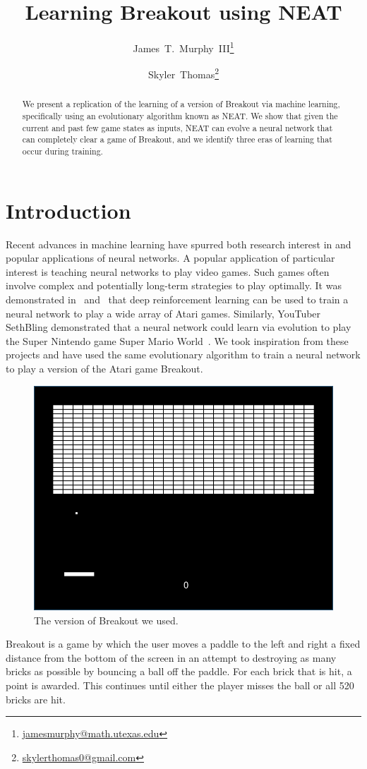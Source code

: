 \documentclass[letterpaper, twocolumn, conference]{article}
\author{James~T.~Murphy~III\thanks{\url{jamesmurphy@math.utexas.edu}}\and{}Skyler~Thomas\thanks{\url{skylerthomas0@gmail.com}}}
\title{Learning Breakout using NEAT}
\begin{document}
\maketitle{}
\begin{abstract}
    We present a replication of the learning of a version of
    Breakout via machine learning, specifically using an evolutionary algorithm known as NEAT.
    We show that given the current and past few game states as inputs, NEAT
    can evolve a neural network that can completely clear a game of Breakout,
    and we identify three eras of learning that occur during training.
\end{abstract}

\section{Introduction}

Recent advances in machine learning have spurred both research interest in and popular applications
of neural networks.
A popular application of particular interest is teaching neural networks to play video games.
Such games often involve complex and potentially long-term strategies to play optimally.
It was demonstrated in~\cite{mnih2013playing} and~\cite{mnih2015human} that deep reinforcement learning can be used to train a neural network
to play a wide array of Atari games.
Similarly, YouTuber SethBling demonstrated that a neural network could learn via evolution to play the Super Nintendo game Super Mario World~\cite{sethbling2015}.
We took inspiration from these projects and have used the same evolutionary algorithm to train a neural network
to play a version of the Atari game Breakout.

\begin{figure}[h!]
    \centering
    \includegraphics[width=.45\textwidth]{breakout.png}
    \caption{The version of Breakout we used.}
\end{figure}

Breakout is a game by which the user moves a paddle to the left and right a fixed distance
from the bottom of the screen in an attempt to destroying as many bricks as possible
by bouncing a ball off the paddle.
For each brick that is hit, a point is awarded.
This continues until either the player misses the ball or all 520 bricks are hit.
\end{document}
